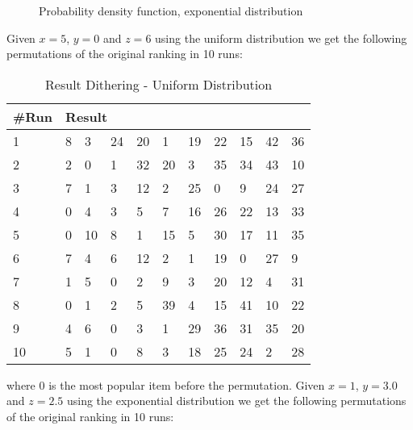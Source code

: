 \begin{figure}[H]
\label{fig:expdist}
  \centering
    \caption{Probability density function, exponential distribution}
\end{figure}

Given $x=5$, $y=0$ and $z=6$ using the uniform distribution we get the following permutations of the original ranking in 10 runs:

\begin{table}[H]
	\centering
	\begin{tabular}{*{11}l}
	\toprule
	\multicolumn{1}{l}{\#Run} & \multicolumn{10}{l}{Result} \\ \midrule
	1 	& 8 & 3 &  24 &  20 &  1 &  19 &  22 &  15 &  42 &  36 \\
	2 	& 2 &  0 &  1 &  32 &  20 &  3 &  35 &  34 &  43 &  10 \\
	3	& 7 &  1 &  3 &  12 &  2 &  25 &  0 &  9 &  24 &  27\\
	4	& 0 &  4 &  3 &  5 &  7 &  16 &  26 &  22 &  13 &  33\\
	5	& 0 &  10 &  8 &  1 &  15 &  5 &  30 &  17 &  11 &  35\\
	6	& 7 &  4 &  6 &  12 &  2 &  1 &  19 &  0 &  27 &  9\\
	7	& 1 &  5 &  0 &  2 &  9 &  3 &  20 &  12 &  4 &  31\\
	8	& 0 &  1 &  2 &  5 &  39 &  4 &  15 &  41 &  10 &  22\\
	9	& 4 &  6 &  0 &  3 &  1 &  29 &  36 &  31 &  35 &  20\\
	10	& 5 &  1 &  0 &  8 &  3 &  18 &  25 & 24 & 2 & 28\\
	\bottomrule
\end{tabular}
\caption{Result Dithering - Uniform Distribution}
\end{table}

where 0 is the most popular item before the permutation. Given $x=1$, $y=3.0$ and $z=2.5$ using the exponential distribution we get the following permutations of the original ranking in 10 runs:

